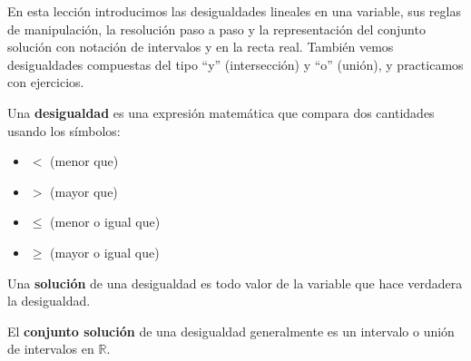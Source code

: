 

En esta lección introducimos las desigualdades lineales en una variable, sus reglas de manipulación, la resolución paso a paso y la representación del conjunto solución con notación de intervalos y en la recta real. También vemos desigualdades compuestas del tipo ``y'' (intersección) y ``o'' (unión), y practicamos con ejercicios.


\begin{definition}
Una \textbf{desigualdad} es una expresión matemática que compara dos cantidades usando los símbolos:
\begin{itemize}
    \item $<$ (menor que)
    \item $>$ (mayor que)
    \item $\le$ (menor o igual que)
    \item $\ge$ (mayor o igual que)
\end{itemize}

Una \textbf{solución} de una desigualdad es todo valor de la variable que hace verdadera la desigualdad.

El \textbf{conjunto solución} de una desigualdad generalmente es un intervalo o unión de intervalos en $\mathbb{R}$.
\end{definition}

